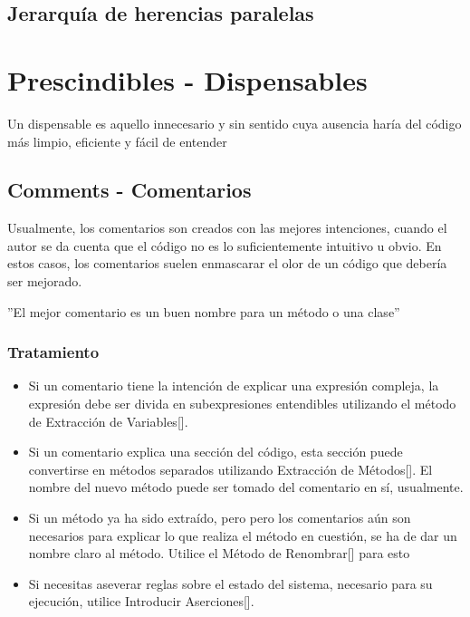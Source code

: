 \documentclass[11pt,a4paper,oneside]{book}
\begin{document}
\subsection{Jerarquía de herencias paralelas}




\section{Prescindibles - Dispensables}


Un dispensable es aquello innecesario y sin sentido cuya ausencia haría del código más limpio, eficiente y fácil de entender

\subsection{Comments - Comentarios}
\label{comments}
Usualmente, los comentarios son creados con las mejores intenciones, cuando el autor se da cuenta que el código no es lo suficientemente intuitivo u obvio. En estos casos, los comentarios suelen enmascarar el olor de un código que debería ser mejorado.

{\centering''El mejor comentario es un buen nombre para un método o una clase''\par}
\subsubsection{Tratamiento}
\begin{itemize}
    \item Si un comentario tiene la intención de explicar una expresión compleja, la expresión debe ser divida en subexpresiones entendibles utilizando el método de Extracción de Variables[\pageref{extracvariable}].
    \item Si un comentario explica una sección del código, esta sección puede convertirse en métodos separados utilizando Extracción de Métodos[\pageref{extractmethod}]. El nombre del nuevo método puede ser tomado del comentario en sí, usualmente.
    \item Si un método ya ha sido extraído, pero pero los comentarios aún son necesarios para explicar lo que realiza el método en cuestión, se ha de dar un nombre claro al método. Utilice el Método de Renombrar[\pageref{renombrarmetodo}] para esto
    \item Si necesitas aseverar reglas sobre el estado del sistema, necesario para su ejecución, utilice Introducir Aserciones[\pageref{}].
\end{itemize}
\end{document}
